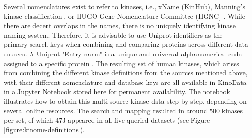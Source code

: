 \documentclass[9pt,lessons]{livecoms}
\begin{document}
Several nomenclatures exist to refer to kinases, i.e., xName \href{http://www.kinhub.org/kinases.html}{(KinHub)}, Manning's kinase classification \cite{manning2002protein}, or HUGO Gene Nomenclature Committee (HGNC) \cite{eyre2006hugo}. 
While there are decent overlaps in the names, there is no uniquely identifying kinase naming system. 
Therefore, it is advisable to use Uniprot identifiers as the primary search keys when combining and comparing proteins across different data sources. 
A Uniprot "Entry name" is a unique and universal alphanumerical code assigned to a specific protein \cite{pundir2016uniprot, zaru2023uniprot}. 
The resulting set of human kinases, which arises from combining the different kinase definitions from the sources mentioned above, with their different nomenclature and database keys are all available in KinoData in a Jupyter Notebook stored \href{https://github.com/openkinome/kinodata/blob/master/human-kinases/human_kinases.ipynb}{here} for permanent availability.
The notebook illustrates how to obtain this multi-source kinase data step by step, depending on several online resources.
The search and mapping resulted in around $500$ kinases per set, of which $473$ appeared in all five queried datasets (see Figure \ref{figure:kinome-definitions}).
\end{document}
